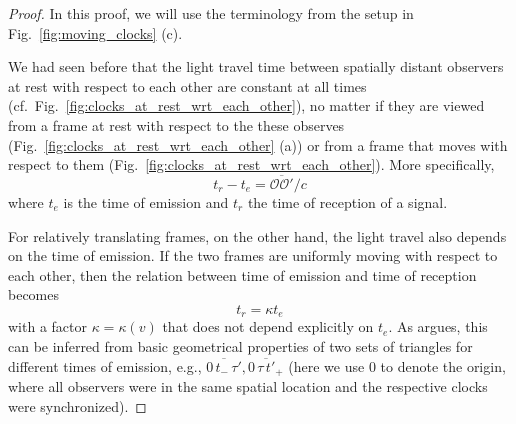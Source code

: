 \documentclass[../relativity_main.tex]{subfiles}
\begin{document}
\begin{proof}
	
	
	
	
	
	
	
	
	
	In this proof, we will use the terminology from the setup in Fig.~\ref{fig:moving_clocks} (c).
	
	We had seen before that the light travel time between spatially distant observers at rest with respect to each other are constant at all times (cf.~Fig.~\ref{fig:clocks_at_rest_wrt_each_other}), no matter if they are viewed from a frame at rest with respect to the these observes (Fig.~\ref{fig:clocks_at_rest_wrt_each_other} (a)) or from a frame that moves with respect to them (Fig.~\ref{fig:clocks_at_rest_wrt_each_other}). More specifically,
	\begin{equation}
		t_r - t_e = \overline{\mathcal{O} \mathcal{O}'} / c
	\end{equation}
	where $t_e$ is the time of emission and $t_r$ the time of reception of a signal.
	
	For relatively translating frames, on the other hand, the light travel also depends on the time of emission. If the two frames are uniformly moving with respect to each other, then the relation between time of emission and time of reception becomes
	\begin{equation}
		t_r = \kappa t_e
	\end{equation}
	with a factor $\kappa = \kappa(v)$ that does not depend explicitly on $t_e$. As \cite{dragon_geometry_srt} argues, this can be inferred from basic geometrical properties of two sets of triangles for different times of emission, e.g., $\overline{0 \, t_- \, \tau'}, \overline{0 \, \tau \, t'_+}$ (here we use $0$ to denote the origin, where all observers were in the same spatial location and the respective clocks were synchronized).
	

\end{proof}
\end{document}
